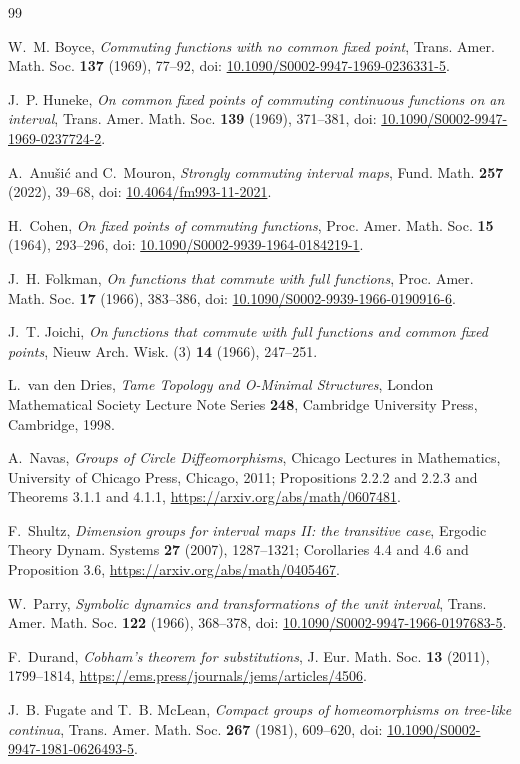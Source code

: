 \documentclass[11pt]{article}
\theoremstyle{definition}
\theoremstyle{remark}
\begin{document}
\begin{thebibliography}{99}

W.~M. Boyce,
\emph{Commuting functions with no common fixed point},
Trans. Amer. Math. Soc. \textbf{137} (1969), 77--92,
doi: \href{https://doi.org/10.1090/S0002-9947-1969-0236331-5}
{10.1090/S0002-9947-1969-0236331-5}.

J.~P. Huneke,
\emph{On common fixed points of commuting continuous functions on an
interval},
Trans. Amer. Math. Soc. \textbf{139} (1969), 371--381,
doi: \href{https://doi.org/10.1090/S0002-9947-1969-0237724-2}
{10.1090/S0002-9947-1969-0237724-2}.

A.~Anu\v{s}i\'c and C.~Mouron,
\emph{Strongly commuting interval maps},
Fund. Math. \textbf{257} (2022), 39--68,
doi: \href{https://doi.org/10.4064/fm993-11-2021}
{10.4064/fm993-11-2021}.

H.~Cohen,
\emph{On fixed points of commuting functions},
Proc. Amer. Math. Soc. \textbf{15} (1964), 293--296,
doi: \href{https://doi.org/10.1090/S0002-9939-1964-0184219-1}
{10.1090/S0002-9939-1964-0184219-1}.

J.~H. Folkman,
\emph{On functions that commute with full functions},
Proc. Amer. Math. Soc. \textbf{17} (1966), 383--386,
doi: \href{https://doi.org/10.1090/S0002-9939-1966-0190916-6}
{10.1090/S0002-9939-1966-0190916-6}.

J.~T. Joichi,
\emph{On functions that commute with full functions and common fixed
points},
Nieuw Arch. Wisk. (3) \textbf{14} (1966), 247--251.

L.~van den Dries,
\emph{Tame Topology and O-Minimal Structures},
London Mathematical Society Lecture Note Series \textbf{248},
Cambridge University Press, Cambridge, 1998.

A.~Navas,
\emph{Groups of Circle Diffeomorphisms},
Chicago Lectures in Mathematics,
University of Chicago Press, Chicago, 2011;
Propositions 2.2.2 and 2.2.3 and Theorems 3.1.1 and 4.1.1,
\url{https://arxiv.org/abs/math/0607481}.

F.~Shultz,
\emph{Dimension groups for interval maps II: the transitive case},
Ergodic Theory Dynam. Systems \textbf{27} (2007), 1287--1321;
Corollaries 4.4 and 4.6 and Proposition 3.6,
\url{https://arxiv.org/abs/math/0405467}.

W.~Parry,
\emph{Symbolic dynamics and transformations of the unit interval},
Trans. Amer. Math. Soc. \textbf{122} (1966), 368--378,
doi: \href{https://doi.org/10.1090/S0002-9947-1966-0197683-5}
{10.1090/S0002-9947-1966-0197683-5}.

F.~Durand,
\emph{Cobham's theorem for substitutions},
J. Eur. Math. Soc. \textbf{13} (2011), 1799--1814,
\url{https://ems.press/journals/jems/articles/4506}.

J.~B. Fugate and T.~B. McLean,
\emph{Compact groups of homeomorphisms on tree-like continua},
Trans. Amer. Math. Soc. \textbf{267} (1981), 609--620,
doi: \href{https://doi.org/10.1090/S0002-9947-1981-0626493-5}
{10.1090/S0002-9947-1981-0626493-5}.

\end{thebibliography}
\end{document}
